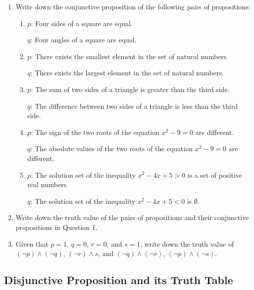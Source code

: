\documentclass{report}
\begin{document}
\begin{enumerate}[leftmargin=*]
    \item Write down the conjunctive proposition of the following pairs of propositions:
          \begin{enumerate}[label=(\alph*), leftmargin=*]
              \item $p$: Four sides of a square are equal.

                    $q$: Four angles of a square are equal.

              \item $p$: There exists the smallest element in the set of natural numbers.

                    $q$: There exists the largest element in the set of natural numbers.

              \item $p$: The sum of two sides of a triangle is greater than the third side.

                    $q$: The difference between two sides of a triangle is less than the third side.

              \item $p$: The sign of the two roots of the equation $x^2 - 9 = 0$ are different.

                    $q$: The absolute values of the two roots of the equation $x^2 - 9 = 0$ are different.

              \item $p$: The solution set of the inequality $x^2 - 4x + 5 > 0$ is a set of positive real numbers.

                    $q$: The solution set of the inequality $x^2 - 4x + 5 < 0$ is $\emptyset$.
          \end{enumerate}

    \item Write down the truth value of the pairs of propositions and their conjunctive
          propositions in Question 1.

    \item Given that $p = 1$, $q = 0$, $r = 0$, and $s = 1$, write down the truth value
          of $(\neg p) \land (\neg q)$, $(\neg r) \land s$, and $(\neg q) \land (\neg
              r)$, $(\neg p) \land (\neg s)$.
\end{enumerate}

\subsection*{Disjunctive Proposition and its Truth Table}
\end{document}
